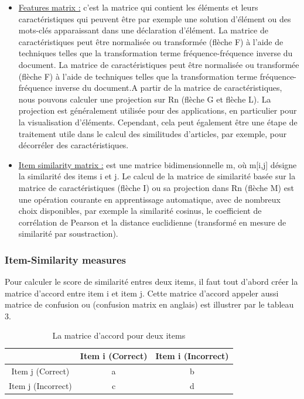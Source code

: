 \begin{itemize}
    \item \underline{Features matrix :} c'est la matrice qui contient les éléments et leurs caractéristiques qui peuvent être par exemple une solution d'élément ou des mots-clés apparaissant dans une déclaration d'élément. La matrice de caractéristiques peut être normalisée ou transformée (flèche F) à l'aide de techniques telles que la transformation terme fréquence-fréquence inverse du document. La matrice de caractéristiques peut être normalisée ou transformée (flèche F) à l'aide de techniques telles que la transformation terme fréquence-fréquence inverse du document.A partir de la matrice de caractéristiques, nous pouvons calculer une projection sur Rn (flèche G et flèche L). La projection est généralement utilisée pour des applications, en particulier pour la visualisation d'éléments. Cependant, cela peut également être une étape de traitement utile dans le calcul des similitudes d'articles, par exemple, pour décorréler des caractéristiques.
	\item \underline{Item similarity matrix :} est une matrice bidimensionnelle m, où m[i,j] désigne la similarité des items i et j. Le calcul de la matrice de similarité basée sur la matrice de caractéristiques (flèche I) ou sa projection dans Rn (flèche M) est une opération courante en apprentissage automatique, avec de nombreux choix disponibles, par exemple la similarité cosinus, le coefficient de corrélation de Pearson et la distance euclidienne (transformé en mesure de similarité par soustraction).
\end{itemize}

\subsubsection{Item-Similarity measures}
Pour calculer le score de similarité entres deux items, il faut tout d’abord créer la matrice d’accord entre item i et item j. Cette matrice d’accord appeler aussi matrice de confusion ou (confusion matrix en anglais) est illustrer par le tableau 3.

\begin{table}[!htbp]
    \centering
	\begin{tabular}{|c| c|c|}
	\hline
	 & Item i (Correct) & Item i (Incorrect)  \\ \hline
	 Item j (Correct) & a & b  \\  \hline
	 Item j (Incorrect) & c & d  \\  \hline
	\end{tabular}
	\caption{La matrice d’accord pour deux items}
	\label{matrice_accord}
\end{table}

